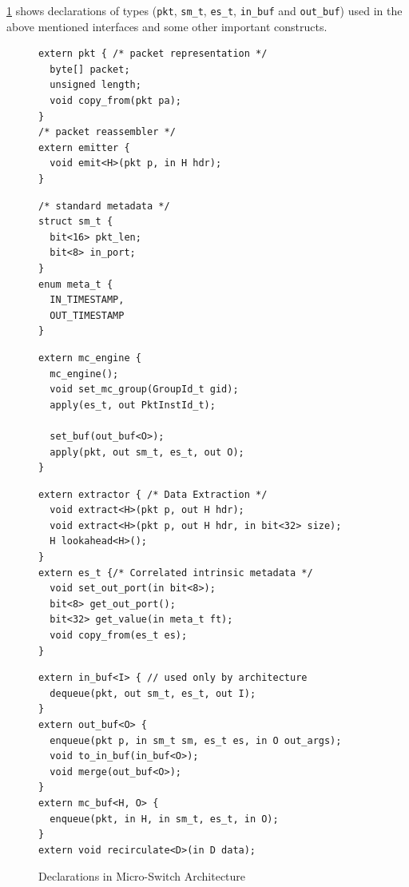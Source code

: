 \documentclass[letterpaper,twocolumn,10pt]{article}
\begin{document}
\cref{fig:micro-switch-architecture} shows declarations of types 
(\texttt{pkt}, \texttt{sm\_t}, \texttt{es\_t}, \texttt{in\_buf} 
and \texttt{out\_buf}) used in the above mentioned interfaces and 
some other important constructs.


\begin{figure}
\begin{minipage}[t]{.38\textwidth}
\begin{lstlisting}[frame=none]
extern pkt { /* packet representation */
  byte[] packet; 
  unsigned length;
  void copy_from(pkt pa);
}
/* packet reassembler */
extern emitter {
  void emit<H>(pkt p, in H hdr);
}
\end{lstlisting}
\end{minipage}\vline
\hfill\begin{minipage}[t]{.22\textwidth}
\begin{lstlisting}[frame=none]
/* standard metadata */
struct sm_t { 
  bit<16> pkt_len;
  bit<8> in_port;
}
enum meta_t {
  IN_TIMESTAMP,
  OUT_TIMESTAMP 
}
\end{lstlisting}
\end{minipage}\vline
\hfill\begin{minipage}[t]{.35\textwidth}
\begin{lstlisting}[frame=none]
extern mc_engine {
  mc_engine();
  void set_mc_group(GroupId_t gid);
  apply(es_t, out PktInstId_t);
  
  set_buf(out_buf<O>);
  apply(pkt, out sm_t, es_t, out O);  
}
\end{lstlisting}
\end{minipage}
\begin{minipage}[t]{0.47\textwidth}
\begin{lstlisting}[frame=none]
extern extractor { /* Data Extraction */
  void extract<H>(pkt p, out H hdr);
  void extract<H>(pkt p, out H hdr, in bit<32> size);
  H lookahead<H>();
}
extern es_t {/* Correlated intrinsic metadata */
  void set_out_port(in bit<8>);
  bit<8> get_out_port();
  bit<32> get_value(in meta_t ft);
  void copy_from(es_t es);
}
\end{lstlisting}
\end{minipage}\vline
\hfill\noindent\begin{minipage}[t]{0.52\textwidth}
\begin{lstlisting}[frame=none]
extern in_buf<I> { // used only by architecture
  dequeue(pkt, out sm_t, es_t, out I);
}
extern out_buf<O> {
  enqueue(pkt p, in sm_t sm, es_t es, in O out_args);
  void to_in_buf(in_buf<O>);
  void merge(out_buf<O>);
}
extern mc_buf<H, O> {
  enqueue(pkt, in H, in sm_t, es_t, in O);
}
extern void recirculate<D>(in D data);
\end{lstlisting}
\end{minipage}
\caption{Declarations in Micro-Switch Architecture}
\label{fig:micro-switch-architecture}
\end{figure}
\end{document}
